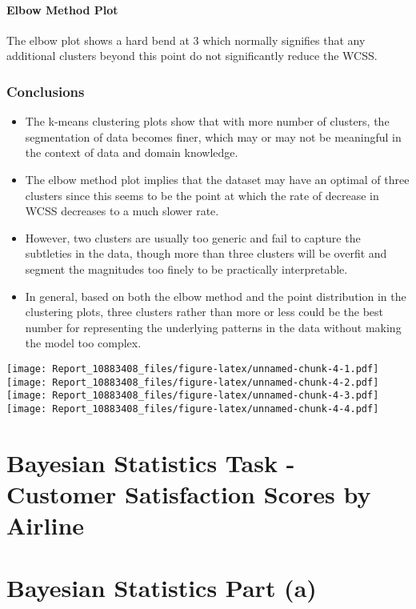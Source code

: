 \documentclass[
]{article}
\begin{document}
\paragraph{Elbow Method Plot}\label{elbow-method-plot-1}

The elbow plot shows a hard bend at 3 which normally signifies that any
additional clusters beyond this point do not significantly reduce the
WCSS.

\subsubsection{Conclusions}\label{conclusions}

\begin{itemize}
\item
  The k-means clustering plots show that with more number of clusters,
  the segmentation of data becomes finer, which may or may not be
  meaningful in the context of data and domain knowledge.
\item
  The elbow method plot implies that the dataset may have an optimal of
  three clusters since this seems to be the point at which the rate of
  decrease in WCSS decreases to a much slower rate.
\item
  However, two clusters are usually too generic and fail to capture the
  subtleties in the data, though more than three clusters will be
  overfit and segment the magnitudes too finely to be practically
  interpretable.
\item
  In general, based on both the elbow method and the point distribution
  in the clustering plots, three clusters rather than more or less could
  be the best number for representing the underlying patterns in the
  data without making the model too complex.
\end{itemize}

\texttt{[image: Report\_10883408\_files/figure-latex/unnamed-chunk-4-1.pdf]}
\texttt{[image: Report\_10883408\_files/figure-latex/unnamed-chunk-4-2.pdf]}
\texttt{[image: Report\_10883408\_files/figure-latex/unnamed-chunk-4-3.pdf]}
\texttt{[image: Report\_10883408\_files/figure-latex/unnamed-chunk-4-4.pdf]}

\section{Bayesian Statistics Task - Customer Satisfaction Scores by
Airline}\label{bayesian-statistics-task---customer-satisfaction-scores-by-airline}

\section{Bayesian Statistics Part (a)}\label{bayesian-statistics-part-a}
\end{document}
